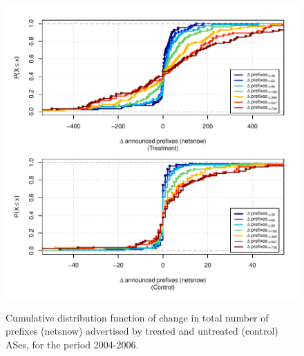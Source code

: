 \clearpage
\vspace*{16pt}
\begin{figure}[H]
\begin{centering}
\begin{singlespace}
\captionsetup{list=no}
    \includegraphics[width=6in]{figures/behavior-netsnow-2004_2006-corr.pdf}
    \vspace{-2em}\\
    \caption{Cumulative distribution function of change in total number of
    prefixes (netsnow) advertised by treated and untreated (control) ASes, for
    the period 2004-2006.}
\end{singlespace}
\end{centering}
\end{figure}


